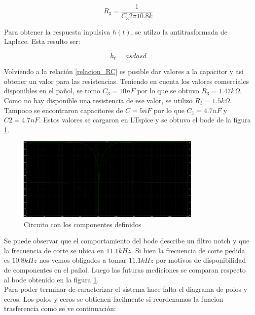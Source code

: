 \documentclass[12pt,a4paper]{article}
\begin{document}
\begin{equation} R_{3} = \frac{1}{C_{3} 2\pi 10.8k} \label{relacion_RC}\end{equation}

Para obtener la respuesta inpulsiva $h(t)$, se utilzo la antitrasformada de Laplace. Esta resulto ser: 

\begin{equation} h_{t} = asdasd  \end{equation}




Volviendo a la relación \ref{relacion_RC} es posible dar valores a la capacitor y asi obtener un valor para las resistencias. Teniendo en cuenta
los valores comerciales disponibles en el pañol, se tomo $C_{3} = 10nF$ por lo que se obtuvo $R_{3}=1.47k\Omega$. Como
no hay disponible una resistencia de ese valor, se utilizo $R_{3}=1.5k\Omega$. Tampoco se encontraron capacitores de $C = 5nF$ 
por lo que $C_{1} = 4.7nF$ y  $C{2} = 4.7nF$. Estos valores se cargaron en LTspice y se obtuvo el bode de la 
figura \ref{fig:bode_ltspice_teorico}.

\begin{figure}[ht]                                                       
    \centering\includegraphics[width=0.8\textwidth]{bode_ltspice_teorico.png}
    \caption{Circuito con los componentes definidos}
    \label{fig:bode_ltspice_teorico}
    \end{figure}

Se puede observar que el comportamiento del bode describe un filtro notch y que la frecuencia de corte se ubica en $11.1kHz$. Si
bien la frecuencia de corte pedida es $10.8kHz$ nos vemos obligados a tomar $11.1kHz$ por motivos de disponibilidad de componentes
en el pañol. Luego las futuras mediciones se comparan respecto al bode obtenido en la figura \ref{fig:bode_ltspice_teorico}. \\

Para poder terminar de caracterizar el sistema hace falta el diagrama de polos y ceros. Los polos y ceros
se obtienen facilmente si reordenamos la funcion trasferencia como se ve continuación:
\end{document}
